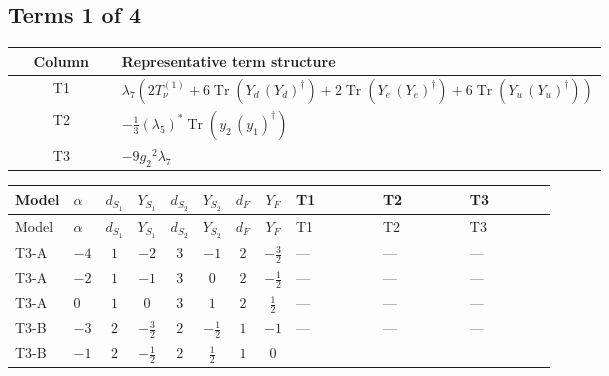 \documentclass[8pt]{article}
\begin{document}
\begin{landscape}
\subsection*{Terms 1 of 4}
\begin{center}
\begin{tabular}{@{}c >{\raggedright\arraybackslash}p{0.82\linewidth}@{}}
\toprule
Column & Representative term structure \\
\midrule
T1 & \(\displaystyle {\lambda_{7}} (2 T_{\nu}^{(1)}+6 \operatorname{Tr}\!\left({Y_d}\,\left({Y_d}\right)^{\dagger}\right)+2 \operatorname{Tr}\!\left({Y_e}\,\left({Y_e}\right)^{\dagger}\right)+6 \operatorname{Tr}\!\left({Y_u}\,\left({Y_u}\right)^{\dagger}\right))\) \\
\midrule
T2 & \(\displaystyle -\frac{1}{3} \left({\lambda_5}\right)^{*} \operatorname{Tr}\!\left({y_2}\,\left({y_1}\right)^{\dagger}\right)\) \\
\midrule
T3 & \(\displaystyle -9 {g_2}^2 {\lambda_{7}}\) \\
\midrule
\bottomrule
\end{tabular}
\end{center}
\smallskip
\tiny
\begin{longtable}{@{}llcccccc >{\raggedright\arraybackslash}p{0.21\linewidth} >{\raggedright\arraybackslash}p{0.21\linewidth} >{\raggedright\arraybackslash}p{0.21\linewidth}@{}}
\toprule
Model & $\alpha$ & $d_{S_1}$ & $Y_{S_1}$ & $d_{S_2}$ & $Y_{S_2}$ & $d_F$ & $Y_F$ & T1 & T2 & T3 \\
\midrule
\endfirsthead
\toprule
Model & $\alpha$ & $d_{S_1}$ & $Y_{S_1}$ & $d_{S_2}$ & $Y_{S_2}$ & $d_F$ & $Y_F$ & T1 & T2 & T3 \\
\midrule
\endhead
T3-A & $-4$ & $1$ & $-2$ & $3$ & $-1$ & $2$ & $-\frac{3}{2}$ & --- & --- & --- \\
\midrule
T3-A & $-2$ & $1$ & $-1$ & $3$ & $0$ & $2$ & $-\frac{1}{2}$ & --- & --- & --- \\
\midrule
T3-A & $0$ & $1$ & $0$ & $3$ & $1$ & $2$ & $\frac{1}{2}$ & --- & --- & --- \\
\midrule
T3-B & $-3$ & $2$ & $-\frac{3}{2}$ & $2$ & $-\frac{1}{2}$ & $1$ & $-1$ & --- & --- & --- \\
\midrule
T3-B & $-1$ & $2$ & $-\frac{1}{2}$ & $2$ & $\frac{1}{2}$ & $1$ & $0$ & \scriptsize\adjustbox{max width=\linewidth}{$\begin{gathered} {\lambda_{7}} (2 T_{\nu}^{(1)}+6 \operatorname{Tr}\!\left({Y_d}\,\left({Y_d}\right)^{\dagger}\right)+2 \operatorname{Tr}\!\left({Y_e}\,\left({Y_e}\right)^{\dagger}\right)+6 \operatorname{Tr}\!\left({Y_u}\,\left({Y_u}\right)^{\dagger}\right))\end{gathered}$} & \scriptsize\adjustbox{max width=\linewidth}{$\begin{gathered} -\frac{1}{3} \left({\lambda_5}\right)^{*} \operatorname{Tr}\!\left({y_2}\,\left({y_1}\right)^{\dagger}\right)\end{gathered}$} & \scriptsize\adjustbox{max width=\linewidth}{$\begin{gathered} -9 {g_2}^2 {\lambda_{7}}\end{gathered}$} \\

\end{longtable}
\end{landscape}
\end{document}
